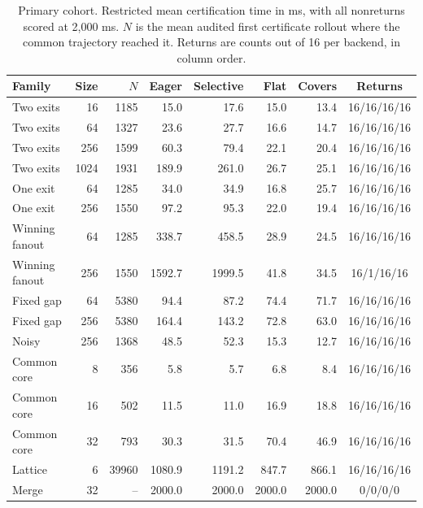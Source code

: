 \begin{table}[t]
\centering\small
\setlength{\tabcolsep}{3pt}
\caption{Primary cohort. Restricted mean certification time in ms, with all nonreturns scored at 2,000 ms. $N$ is the mean audited first certificate rollout where the common trajectory reached it. Returns are counts out of 16 per backend, in column order.}
\label{tab:ta-cert}
\begin{tabular}{lr r rrrr c}\toprule
Family & Size & $N$ & Eager & Selective & Flat & Covers & Returns\\\midrule
Two exits & 16 & 1185 & 15.0 & 17.6 & 15.0 & 13.4 & 16/16/16/16\\
Two exits & 64 & 1327 & 23.6 & 27.7 & 16.6 & 14.7 & 16/16/16/16\\
Two exits & 256 & 1599 & 60.3 & 79.4 & 22.1 & 20.4 & 16/16/16/16\\
Two exits & 1024 & 1931 & 189.9 & 261.0 & 26.7 & 25.1 & 16/16/16/16\\
One exit & 64 & 1285 & 34.0 & 34.9 & 16.8 & 25.7 & 16/16/16/16\\
One exit & 256 & 1550 & 97.2 & 95.3 & 22.0 & 19.4 & 16/16/16/16\\
Winning fanout & 64 & 1285 & 338.7 & 458.5 & 28.9 & 24.5 & 16/16/16/16\\
Winning fanout & 256 & 1550 & 1592.7 & 1999.5 & 41.8 & 34.5 & 16/1/16/16\\
Fixed gap & 64 & 5380 & 94.4 & 87.2 & 74.4 & 71.7 & 16/16/16/16\\
Fixed gap & 256 & 5380 & 164.4 & 143.2 & 72.8 & 63.0 & 16/16/16/16\\
Noisy & 256 & 1368 & 48.5 & 52.3 & 15.3 & 12.7 & 16/16/16/16\\
Common core & 8 & 356 & 5.8 & 5.7 & 6.8 & 8.4 & 16/16/16/16\\
Common core & 16 & 502 & 11.5 & 11.0 & 16.9 & 18.8 & 16/16/16/16\\
Common core & 32 & 793 & 30.3 & 31.5 & 70.4 & 46.9 & 16/16/16/16\\
Lattice & 6 & 39960 & 1080.9 & 1191.2 & 847.7 & 866.1 & 16/16/16/16\\
Merge & 32 & -- & 2000.0 & 2000.0 & 2000.0 & 2000.0 & 0/0/0/0\\
\bottomrule\end{tabular}
\end{table}
